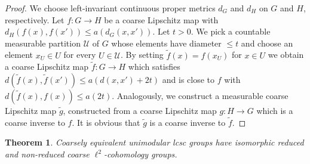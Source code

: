 \documentclass[10pt]{amsart}
\theoremstyle{plain}
\newtheorem{thm}{Theorem}
\theoremstyle{definition}
\theoremstyle{remark}
\begin{document}
\begin{proof}
We choose left-invariant continuous proper metrics $d_G$ and $d_H$ on $G$ and $H$, respectively. Let $f\colon G\to H$ be a coarse Lipschitz map with $d_H(f(x), f(x'))\leq a(d_G(x,x'))$. Let $t>0$. We pick a countable measurable partition $\mathcal{U}$ of $G$ whose elements have diameter $\le t$ and choose an element $x_U\in U$ for every $U\in \mathcal{U}$.
By setting $\tilde{f}(x)=f(x_U)$ for $x\in U$ we obtain a coarse Lipschitz map $\tilde{f}\colon G\to H$ which satisfies 
$d(\tilde{f}(x),\tilde{f}(x'))\le a(d(x,x')+2t)$
and is close to $f$ with $d(\tilde{f}(x),f(x))\leq a(2t)$. Analogously, we construct  a measurable coarse Lipschitz map $\tilde{g}$, constructed from a coarse Lipschitz map $g\colon H\to G$ which is a coarse inverse to $f$. It is obvious that $\tilde{g}$ is a coarse inverse to $\tilde{f}$.
\end{proof}
\begin{thm}\label{qi invariance of HX}
Coarsely equivalent unimodular lcsc groups have isomorphic reduced and non-reduced coarse $\ell^2$-cohomology groups.
\end{thm}
\end{document}
